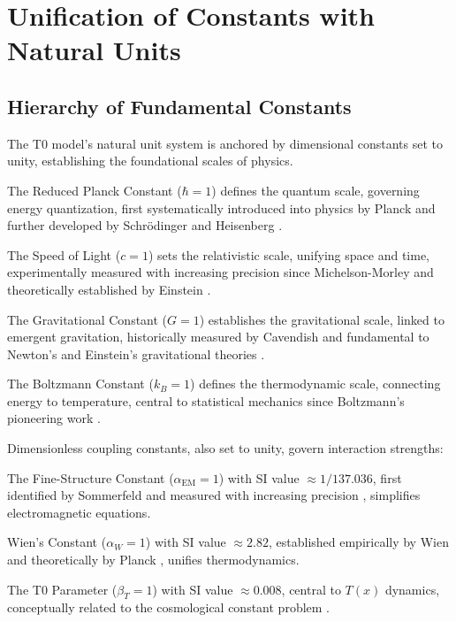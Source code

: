 \documentclass[twocolumn,aps,prl]{revtex4-2}
\begin{document}
\section{Unification of Constants with Natural Units}
\label{sec:hierarchy}

\subsection{Hierarchy of Fundamental Constants}
\label{subsec:level1}

The T0 model's natural unit system is anchored by dimensional constants set to unity, establishing the foundational scales of physics.

The Reduced Planck Constant ($\hbar = 1$) defines the quantum scale, governing energy quantization, first systematically introduced into physics by Planck \cite{Planck1901} and further developed by Schrödinger \cite{Schrodinger1926b} and Heisenberg \cite{Heisenberg1925}.

The Speed of Light ($c = 1$) sets the relativistic scale, unifying space and time, experimentally measured with increasing precision since Michelson-Morley \cite{Michelson1887} and theoretically established by Einstein \cite{Einstein1905}.

The Gravitational Constant ($G = 1$) establishes the gravitational scale, linked to emergent gravitation, historically measured by Cavendish \cite{Cavendish1798} and fundamental to Newton's \cite{Newton1687} and Einstein's gravitational theories \cite{Einstein1916}.

The Boltzmann Constant ($k_B = 1$) defines the thermodynamic scale, connecting energy to temperature, central to statistical mechanics since Boltzmann's pioneering work \cite{Boltzmann1872}.

Dimensionless coupling constants, also set to unity, govern interaction strengths:

The Fine-Structure Constant ($\alpha_{\text{EM}} = 1$) with SI value $\approx 1/137.036$, first identified by Sommerfeld \cite{Sommerfeld1916} and measured with increasing precision \cite{Aoyama2018}, simplifies electromagnetic equations.

Wien's Constant ($\alpha_W = 1$) with SI value $\approx 2.82$, established empirically by Wien \cite{Wien1896} and theoretically by Planck \cite{Planck1901}, unifies thermodynamics.

The T0 Parameter ($\beta_T = 1$) with SI value $\approx 0.008$, central to $T(x)$ dynamics, conceptually related to the cosmological constant problem \cite{Weinberg1989, Martin2012}.
\end{document}
